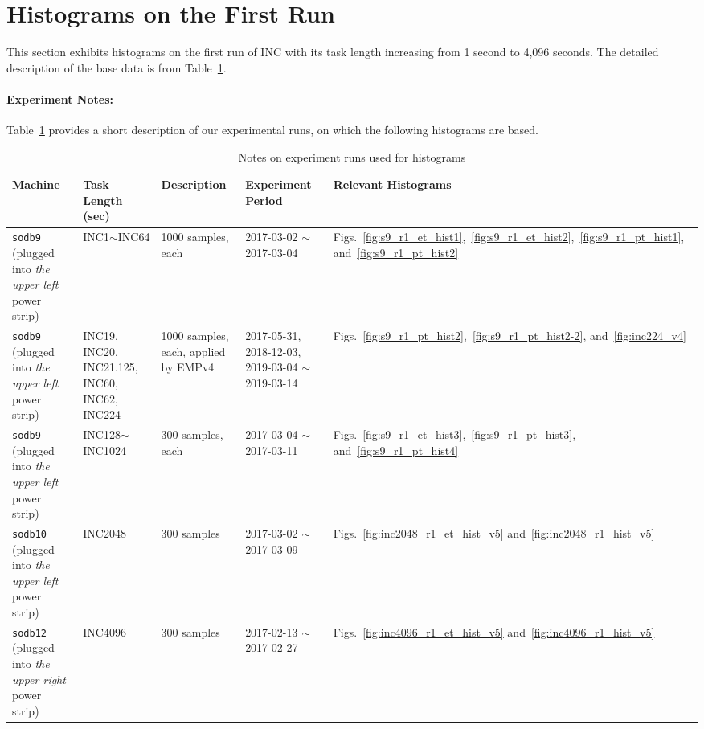 \section{Histograms on the First Run~\label{sec:first_run}} 
This section exhibits histograms on the first run of 
INC with its task length increasing from 1 second to 4,096 seconds. 
The detailed description of the base data is from Table~\ref{tab:exp_notes1}.

\paragraph{Experiment Notes:}
Table~\ref{tab:exp_notes1} provides a short description of our experimental runs, 
on which the following histograms are based.

\begin{table}[h]
\begin{center}
\begin{tabular}{|p{3cm}|p{2cm}|p{3cm}|p{4cm}|p{3cm}|} \hline
Machine & Task Length (sec) & Description & Experiment Period & Relevant \linebreak Histograms\\ \hline
{\tt sodb9} (plugged into {\em the upper left} power strip)  &  INC1$\sim$INC64 & 1000 samples, each & 2017-03-02 $\sim$ 2017-03-04 & Figs.~\ref{fig:s9_r1_et_hist1},~\ref{fig:s9_r1_et_hist2},~\ref{fig:s9_r1_pt_hist1}, and~\ref{fig:s9_r1_pt_hist2}\\ \hline

{\tt sodb9} (plugged into {\em the upper left} power strip) &  INC19, INC20, INC21.125, INC60, INC62, INC224 & 1000 samples, each, applied by EMPv4 & 2017-05-31, 2018-12-03, 2019-03-04 $\sim$ 2019-03-14 & Figs.~\ref{fig:s9_r1_pt_hist2},~\ref{fig:s9_r1_pt_hist2-2}, and~\ref{fig:inc224_v4}\\ \hline

{\tt sodb9} (plugged into {\em the upper left} power strip)  &  INC128$\sim$ INC1024 & 300 samples, each & 2017-03-04 $\sim$ 2017-03-11 & 
Figs.~\ref{fig:s9_r1_et_hist3},~\ref{fig:s9_r1_pt_hist3}, and~\ref{fig:s9_r1_pt_hist4}\\ \hline

{\tt sodb10} (plugged into {\em the upper left} power strip)  & INC2048 & 300 samples & 2017-03-02 $\sim$ 2017-03-09 & Figs.~\ref{fig:inc2048_r1_et_hist_v5} and~\ref{fig:inc2048_r1_hist_v5}\\ \hline
{\tt sodb12} (plugged into {\em the upper right} power strip)  & INC4096 & 300 samples & 2017-02-13 $\sim$ 2017-02-27 & Figs.~\ref{fig:inc4096_r1_et_hist_v5} and~\ref{fig:inc4096_r1_hist_v5}\\ \hline
\end{tabular}
\end{center}
\vspace{-.2in}
\caption{Notes on experiment runs used for histograms\label{tab:exp_notes1}}
\end{table}


